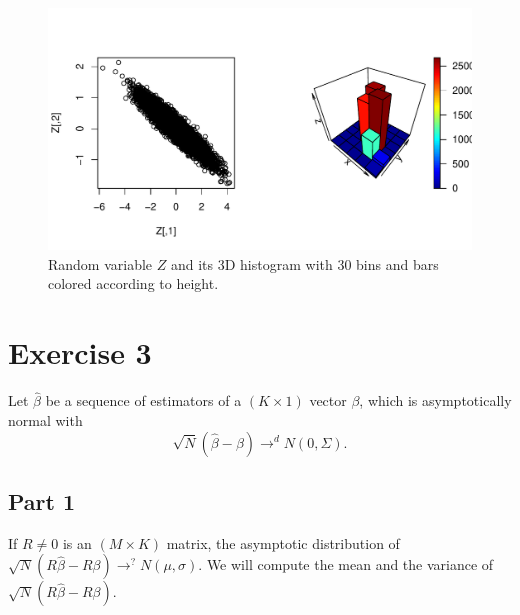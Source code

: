 \documentclass[12pt, a4paper]{article}\usepackage[]{graphicx}\usepackage[]{color}
\makeatletter
\def\maxwidth{ %
  \ifdim\Gin@nat@width>\linewidth
    \linewidth
  \else
    \Gin@nat@width
  \fi
}
\newenvironment{knitrout}{}{} %
\makeatother
\begin{document}
\begin{knitrout}
\color{fgcolor}\begin{figure}[H]

{\centering \includegraphics[width=\maxwidth]{figure/ex2_4histZ-1} 

}

\caption[Random variable $Z$ and its 3D histogram with 30 bins and bars colored according to height]{Random variable $Z$ and its 3D histogram with 30 bins and bars colored according to height.}\label{fig:ex2.4histZ}
\end{figure}


\end{knitrout}












\section{Exercise 3}


Let $\hat{\beta}$ be a sequence of estimators of a $(K\times 1)$ vector $\beta$, which is asymptotically normal with 
\[ \sqrt{N} (\hat{\beta} - \beta) \rightarrow^d N(0,\Sigma) .\]

\subsection{Part 1}

If $R \neq 0$ is an $(M\times K)$ matrix, the asymptotic distribution of $\sqrt{N} (R \hat{\beta} - R \beta) \rightarrow^? N(\mu, \sigma)$. We will compute the mean and the variance of $\sqrt{N} (R \hat{\beta} - R \beta)$.
\end{document}
